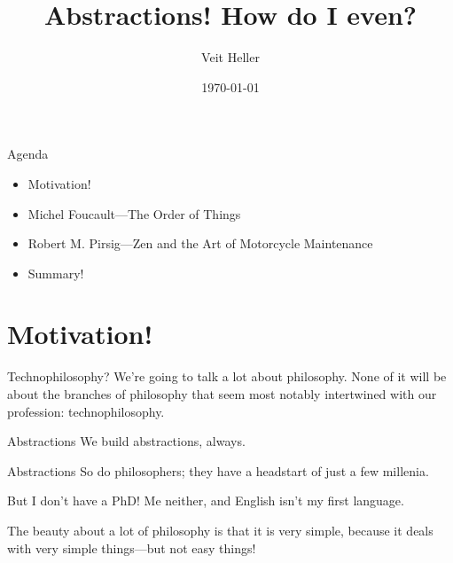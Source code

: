 \documentclass[aspectratio=169]{beamer}
\title{Abstractions! How do I even?}
\date{\today}
\author{Veit Heller}
\institute{EnthusiastiCon 2019}
\begin{document}
  \maketitle
  \begin{frame}{Agenda}
    \begin{itemize}
      \item Motivation!
      \item Michel Foucault—The Order of Things
      \item Robert M. Pirsig—Zen and the Art of Motorcycle Maintenance
      \item Summary!
    \end{itemize}
  \end{frame}
  \section{Motivation!}
  \begin{frame}{Technophilosophy?}
    We’re going to talk a lot about philosophy. None of it will be about the
    branches of philosophy that seem most notably intertwined with our
    profession: technophilosophy.
  \end{frame}
  \begin{frame}{Abstractions}
    We build abstractions, always.
  \end{frame}
  \begin{frame}{Abstractions}
    So do philosophers; they have a headstart of just a few millenia.
  \end{frame}
  \begin{frame}{But I don’t have a PhD!}
    Me neither, and English isn’t my first language.

    The beauty about a lot of philosophy is that it is very simple, because it
    deals with very simple things—but not easy things!
  \end{frame}
\end{document}
